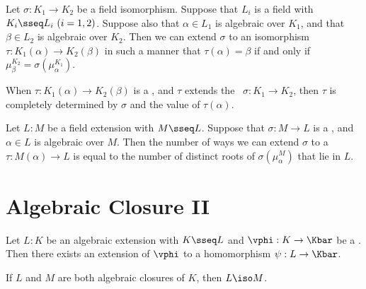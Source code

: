 \documentclass{article}
\begin{document}
\begin{ttheorem}
  Let \( \sigma :K_1\to K_2 \) be a field isomorphism.
  Suppose that \( L_i \) is a field with \( K_i\sseq L_i\ (i=1,2) \).
  Suppose also that \( \alpha\in L_1 \) is algebraic over \( K_1 \), and that \( \beta\in L_2 \) is algebraic over \( K_2 \).
  Then we can extend \( \sigma \) to an isomorphism \( \tau:K_1(\alpha)\to K_2(\beta) \) in such a manner that \( \tau(\alpha) = \beta \) if and only if \( \mu_\beta^{K_2} = \sigma(\mu_\alpha^{K_1}) \).
  \begin{center}
  \end{center}
\end{ttheorem}

\quad When \( \tau:K_1(\alpha)\to K_2(\beta) \) is a \homo, and \( \tau \) extends the \homo~\( \sigma:K_1\to K_2 \), then \( \tau \) is completely determined by \( \sigma \) and the value of \( \tau(\alpha) \).

\begin{tcorollary}
  Let \( L:M \) be a field extension with \( M\sseq L \). Suppose that \( \sigma:M\to L \) is a \homo, and \( \alpha\in L \) is algebraic over \( M \).
  Then the number of ways we can extend \( \sigma \) to a \homo~\( \tau:M(\alpha)\to L \) is equal to the number of distinct roots of \( \sigma(\mu_\alpha^{M}) \) that lie in \( L \).
\end{tcorollary}

\section{Algebraic Closure II}
\begin{ttheorem}
  Let \( L:K \) be an algebraic extension with \( K\sseq L \) and \( \vphi:K\to\Kbar \) be a \homo.
  Then there exists an extension of \( \vphi \) to a homomorphism \( \psi:L\to\Kbar \).
\end{ttheorem}

\begin{ttheorem}
  If \( L \) and \( M \) are both algebraic closures of \( K \), then \( L \iso M \).
\end{ttheorem}
\end{document}
